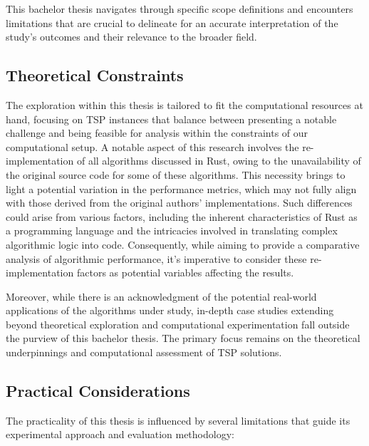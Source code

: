 This bachelor thesis navigates through specific scope definitions and encounters limitations that are crucial to delineate for an accurate interpretation of the study's outcomes and their relevance to the broader field.

\subsection{Theoretical Constraints}

The exploration within this thesis is tailored to fit the computational resources at hand, focusing on TSP instances that balance between presenting a notable challenge and being feasible for analysis within the constraints of our computational setup. A notable aspect of this research involves the re-implementation of all algorithms discussed in Rust, owing to the unavailability of the original source code for some of these algorithms. This necessity brings to light a potential variation in the performance metrics, which may not fully align with those derived from the original authors' implementations. Such differences could arise from various factors, including the inherent characteristics of Rust as a programming language and the intricacies involved in translating complex algorithmic logic into code. Consequently, while aiming to provide a comparative analysis of algorithmic performance, it's imperative to consider these re-implementation factors as potential variables affecting the results.

Moreover, while there is an acknowledgment of the potential real-world applications of the algorithms under study, in-depth case studies extending beyond theoretical exploration and computational experimentation fall outside the purview of this bachelor thesis. The primary focus remains on the theoretical underpinnings and computational assessment of TSP solutions.

\subsection{Practical Considerations}

The practicality of this thesis is influenced by several limitations that guide its experimental approach and evaluation methodology:

